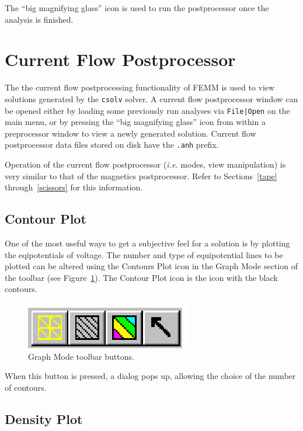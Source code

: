 The ``big magnifying glass'' icon is used to run the postprocessor once the
analysis is finished.



\section{Current Flow Postprocessor}

The the current flow postprocessing functionality of FEMM is
used to view solutions generated by the {\tt csolv} solver.  A current flow
postprocessor window can be opened either by loading
some previously run analyses via {\tt File|Open} on the main menu,
or by pressing the ``big magnifying glass'' icon from within a
preprocessor window to view a newly generated solution.
Current flow postprocessor data files stored on disk have the
{\tt .anh} prefix.

Operation of the current flow postprocessor ({\em i.e.} modes, view manipulation) is
very similar to that of the magnetics postprocessor.  Refer to
Sections~\ref{tape} through~\ref{scissors} for this information.

\subsection{Contour Plot}

One of the most useful ways to get a subjective feel for a solution
is by plotting the eqipotentials of voltage. The number and type of equipotential
lines to be plotted can be altered using the Contours Plot icon in
the Graph Mode section of the toolbar (see Figure~\ref{cfig17}). The
Contour Plot icon is the icon with the black contours.

\begin{figure}[htbp]
\centerline{\includegraphics{hplotbar.ps}}
\caption{Graph Mode toolbar buttons.}
\label{cfig17}
\end{figure}

When this button is pressed, a dialog pops up, allowing the choice of the
number of contours.

\subsection{Density Plot}

